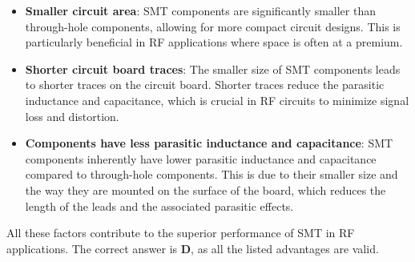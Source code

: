 \begin{itemize}
    \item \textbf{Smaller circuit area}: SMT components are significantly smaller than through-hole components, allowing for more compact circuit designs. This is particularly beneficial in RF applications where space is often at a premium.
    \item \textbf{Shorter circuit board traces}: The smaller size of SMT components leads to shorter traces on the circuit board. Shorter traces reduce the parasitic inductance and capacitance, which is crucial in RF circuits to minimize signal loss and distortion.
    \item \textbf{Components have less parasitic inductance and capacitance}: SMT components inherently have lower parasitic inductance and capacitance compared to through-hole components. This is due to their smaller size and the way they are mounted on the surface of the board, which reduces the length of the leads and the associated parasitic effects.
\end{itemize}

All these factors contribute to the superior performance of SMT in RF applications. The correct answer is \textbf{D}, as all the listed advantages are valid.

